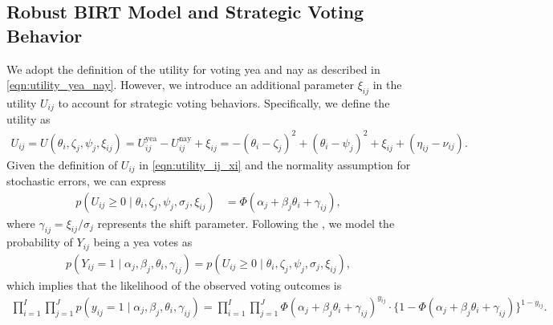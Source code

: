 \documentclass[11pt]{article}
\begin{document}
\subsection{Robust BIRT Model and Strategic Voting 
Behavior}\label{sub_sec_3.1}
We adopt the definition of the utility for voting yea and nay as described in \eqref{eqn:utility_yea_nay}. However, we introduce an additional parameter $ \xi_{ij} $ in the utility $ U_{ij} $ to account for strategic voting behaviors. Specifically, we define the utility as  
\begin{align}\label{eqn:utility_ij_xi}
    U_{ij} = U(\theta_i, \zeta_j, \psi_j, \xi_{ij}) = U_{ij}^{\text{yea}} - U_{ij}^{\text{nay}} + \xi_{ij} = -(\theta_i - \zeta_j)^2 + (\theta_i - \psi_j)^2 + \xi_{ij} + (\eta_{ij} - \nu_{ij}).
\end{align}  
Given the definition of $U_{ij}$ in \eqref{eqn:utility_ij_xi} and the normality assumption for stochastic errors, we can express 
\begin{align*}
    p(U_{ij} \geq 0 \mid \theta_i, \zeta_j, \psi_j, \sigma_j, \xi_{ij}) 
    &= \Phi(\alpha_j + \beta_j \theta_i + \gamma_{ij}),
\end{align*}  
where $\gamma_{ij} = \xi_{ij}/\sigma_j$ represents the shift parameter.
Following the \cite{Clinton2004}, we model the probability of $Y_{ij}$ being a yea votes as 
\begin{align*}
     p(Y_{ij} = 1 \mid \alpha_j, \beta_j, \theta_i, \gamma_{ij}) = p(U_{ij} \geq 0 \mid \theta_i, \zeta_j, \psi_j, \sigma_j, \xi_{ij}),
\end{align*}
which implies that the likelihood of the observed voting outcomes is
\begin{align}\label{eqn:like_gamma}
    \prod_{i=1}^I \prod_{j=1}^J p(y_{ij} = 1 \mid \alpha_j, \beta_j, \theta_i, \gamma_{ij}) = \prod_{i=1}^I \prod_{j = 1}^J \Phi(\alpha_j + \beta_j \theta_i + \gamma_{ij})^{y_{ij}} \cdot \{1-\Phi(\alpha_j + \beta_j \theta_i + \gamma_{ij})\}^{1-y_{ij}}.
\end{align}  
\end{document}
